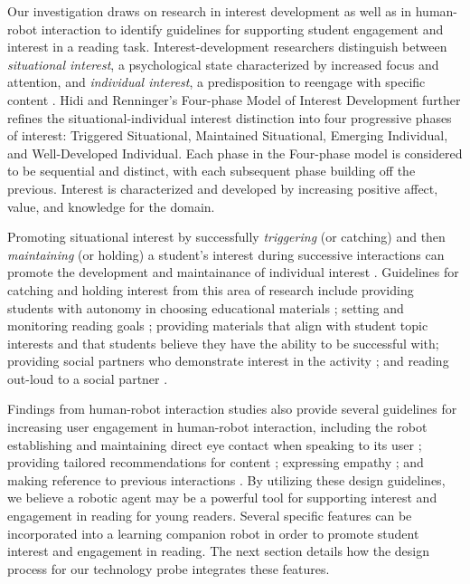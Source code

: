 \documentclass{sigchi}
\begin{document}
Our investigation draws on research in interest development as well as in human-robot interaction to identify guidelines for supporting student engagement and interest in a reading task. Interest-development researchers distinguish between \textit{situational interest}, a psychological state characterized by increased focus and attention, and \textit{individual interest}, a predisposition to reengage with specific content \cite{Krapp:1999}. Hidi and Renninger's  \cite{Hidi:2006} Four-phase Model of Interest Development further refines the situational-individual interest distinction into four progressive phases of interest: Triggered Situational, Maintained Situational, Emerging Individual, and Well-Developed Individual. Each phase in the Four-phase model is considered to be sequential and distinct, with each subsequent phase building off the previous. Interest is characterized and developed by increasing positive affect, value, and knowledge for the domain. \cite{Renninger:2011}   

Promoting situational interest by successfully \textit{triggering} (or catching) and then \textit{maintaining} (or holding) a student's interest during successive interactions can promote the development and maintainance of individual interest \cite{Hidi:2006, Mitchell:1993}. Guidelines for catching and holding interest from this area of research include providing students with autonomy in choosing educational materials \cite{Jones:2011}; setting and monitoring reading goals \cite{Cabral:2015}; providing materials that align with student topic interests \cite{Ainley:2002} and that students believe they have the ability to be successful with; providing social partners who demonstrate interest in the activity \cite{Sansone:2005}; and reading out-loud to a social partner \cite{Rasinski:2003}. 

Findings from human-robot interaction studies also provide several guidelines for increasing user engagement in human-robot interaction, including the robot establishing and maintaining direct eye contact when speaking to its user \cite{Mutlu:2011}; providing tailored recommendations for content \cite{Lim:2013}; expressing empathy \cite{Leite:2012}; and making reference to previous interactions \cite{Leite:2009}. By utilizing these design guidelines, we believe a robotic agent may be a powerful tool for supporting interest and engagement in reading for young readers. Several specific features can be incorporated into a learning companion robot in order to promote student interest and engagement in reading. The next section details how the design process for our technology probe integrates these features.
\end{document}
